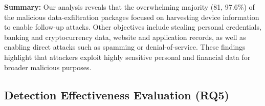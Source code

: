 \begin{tcolorbox}[size=title, opacityfill=0.15, after=\vspace{-10pt}]
\textbf{Summary:} Our analysis reveals that the overwhelming majority (81, 97.6\%) of the malicious data-exfiltration packages focused on harvesting device information to enable follow-up attacks. Other objectives include stealing personal credentials, banking and cryptocurrency data, website and application records, as well as enabling direct attacks such as spamming or denial-of-service. These findings highlight that attackers exploit highly sensitive personal and financial data for broader malicious purposes.

\end{tcolorbox}


\subsection{Detection Effectiveness Evaluation (RQ5)}


